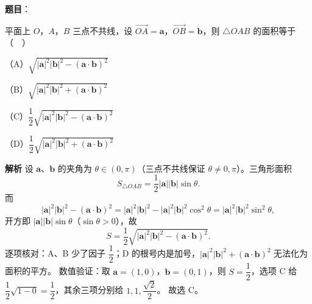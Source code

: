 \begin{answer}

\textbf{题目}：

平面上 $O$，$A$，$B$ 三点不共线，设 $\overrightarrow{OA}=\boldsymbol a$，$\overrightarrow{OB}=\boldsymbol b$，则 $\triangle OAB$ 的面积等于（　）

（A）$\sqrt{|\boldsymbol a|^2|\boldsymbol b|^2-(\boldsymbol a\cdot\boldsymbol b)^2}$

（B）$\sqrt{|\boldsymbol a|^2|\boldsymbol b|^2+(\boldsymbol a\cdot\boldsymbol b)^2}$

（C）$\dfrac12\sqrt{|\boldsymbol a|^2|\boldsymbol b|^2-(\boldsymbol a\cdot\boldsymbol b)^2}$

（D）$\dfrac12\sqrt{|\boldsymbol a|^2|\boldsymbol b|^2+(\boldsymbol a\cdot\boldsymbol b)^2}$

\textbf{解析}
设 $\boldsymbol a$、$\boldsymbol b$ 的夹角为 $\theta\in(0,\pi)$（三点不共线保证 $\theta\neq0,\pi$）。三角形面积
\nopagebreak[4]
\[S_{\triangle OAB}=\frac12|\boldsymbol a||\boldsymbol b|\sin\theta.\]
而
\nopagebreak[4]
\[|\boldsymbol a|^2|\boldsymbol b|^2-(\boldsymbol a\cdot\boldsymbol b)^2
=|\boldsymbol a|^2|\boldsymbol b|^2-|\boldsymbol a|^2|\boldsymbol b|^2\cos^2\theta
=|\boldsymbol a|^2|\boldsymbol b|^2\sin^2\theta,\]
开方即 $|\boldsymbol a||\boldsymbol b|\sin\theta$（$\sin\theta>0$），故
\nopagebreak[4]
\[S=\frac12\sqrt{|\boldsymbol a|^2|\boldsymbol b|^2-(\boldsymbol a\cdot\boldsymbol b)^2}.\]
逐项核对：A、B 少了因子 $\dfrac12$；D 的根号内是加号，$|\boldsymbol a|^2|\boldsymbol b|^2+(\boldsymbol a\cdot\boldsymbol b)^2$ 无法化为面积的平方。
数值验证：取 $\boldsymbol a=(1,0)$，$\boldsymbol b=(0,1)$，则 $S=\dfrac12$，选项 C 给 $\dfrac12\sqrt{1-0}=\dfrac12$，其余三项分别给 $1,1,\dfrac{\sqrt2}{2}$。
故选 C。


\end{answer}
